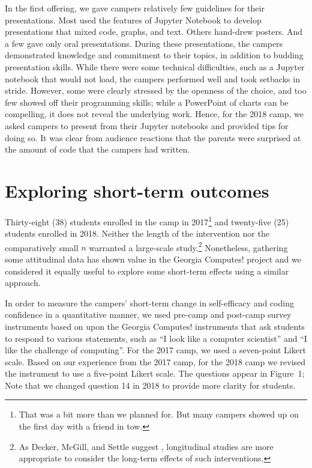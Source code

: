 In the first offering, we gave campers relatively few guidelines for their
presentations.  Most used the features of Jupyter Notebook to develop
presentations that mixed code, graphs, and text.  Others hand-drew
posters.  And a few gave only oral presentations.  During these
presentations, the campers demonstrated knowledge and commitment
to their topics, in addition to budding presentation skills. While
there were some technical difficulties, such as a Jupyter notebook
that would not load, the campers performed well and took setbacks
in stride.  However, some were clearly stressed by the openness of
the choice, and too few showed off their programming skills; while
a PowerPoint of charts can be compelling, it does
not reveal the underlying work.  Hence, for the 2018 camp, we asked
campers to present from their Jupyter notebooks and provided
tips for doing so.  It was clear from audience reactions that the
parents were surprised at the amount of code that the campers had
written.

\section{Exploring short-term outcomes}

Thirty-eight (38) students enrolled in the camp in 2017\footnote{That
was a bit more than we planned for.  But many campers showed up on
the first day with a friend in tow.} and twenty-five (25) students
enrolled in 2018.  Neither the length of the intervention nor the
comparatively small $n$ warranted a large-scale study.\footnote{
As Decker, McGill, and Settle suggest \cite{Decker2016,McGill2015},
longitudinal studies are more appropriate to consider the long-term
effects of such interventions.}  Nonetheless, gathering some
attitudinal data has shown value in the Georgia Computes! project
\cite{Bruckman2009} and we considered it equally useful to explore
some short-term effects using a similar approach.

In order to measure the campers' short-term change in self-efficacy
and coding confidence in a quantitative manner, we used pre-camp
and post-camp survey instruments based on upon the Georgia Computes!
instruments \cite{Bruckman2009} that ask students to respond to
various statements, such as ``I look like a computer scientist''
and ``I like the challenge of computing''.  For the 2017 camp, we
used  a seven-point Likert scale.  Based on our experience from the
2017 camp, for the 2018 camp we revised the instrument to use a
five-point Likert scale.  The questions appear in Figure~1; Note
that we changed question 14 in 2018 to provide more clarity for
students.

